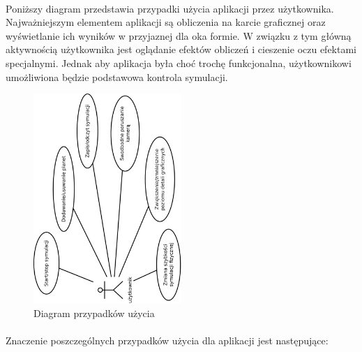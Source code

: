 \paragraph{}

Poniższy diagram przedstawia przypadki użycia aplikacji przez użytkownika. Najważniejszym elementem aplikacji są obliczenia na karcie graficznej oraz wyświetlanie ich wyników w przyjaznej dla oka formie. W związku z tym główną aktywnością użytkownika jest oglądanie efektów obliczeń i cieszenie oczu efektami specjalnymi. Jednak aby aplikacja była choć trochę funkcjonalna, użytkownikowi umożliwiona będzie podstawowa kontrola symulacji.

\begin{figure}[h]
	\centering
	\includegraphics[width=0.5\textwidth,angle=-90]{use-case.pdf}
	\caption{Diagram przypadków użycia}
	\label{fig:use-case}
\end{figure}

\paragraph{}

Znaczenie poszczególnych przypadków użycia dla aplikacji jest następujące:

